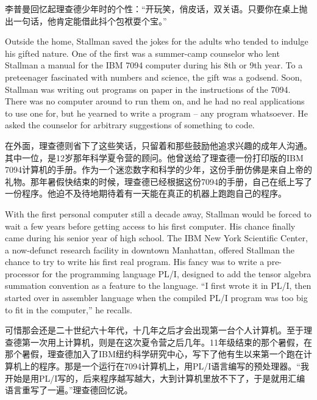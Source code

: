 \ifdefined\chs
李普曼回忆起理查德少年时的个性：“开玩笑，俏皮话，双关语。只要你在桌上抛出一句话，他肯定能借此抖个包袱耍个宝。”
\fi

\ifdefined\eng
Outside the home, Stallman saved the jokes for the adults who tended to indulge his gifted nature. One of the first was a summer-camp counselor who lent Stallman a manual for the IBM 7094 computer during his 8th or 9th year. To a preteenager fascinated with numbers and science, the gift was a godsend. Soon, Stallman was writing out programs on paper in the instructions of the 7094.  There was no computer around to run them on, and he had no real applications to use one for, but he yearned to write a program -- any program whatsoever.  He asked the counselor for arbitrary suggestions of something to code.
\fi

\ifdefined\chs
在外面，理查德则省下了这些笑话，只留着和那些鼓励他追求兴趣的成年人沟通。其中一位，是12岁那年科学夏令营的顾问。他曾送给了理查德一份打印版的IBM 7094计算机的手册。作为一个迷恋数字和科学的少年，这份手册仿佛是来自上帝的礼物。那年暑假快结束的时候，理查德已经根据这份7094的手册，自己在纸上写了一份程序。他迫不及待地期待着有一天能在真正的机器上跑跑自己的程序。
\fi

\ifdefined\eng
With the first personal computer still a decade away, Stallman would be forced to wait a few years before getting access to his first computer. His chance finally came during his senior year of high school.  The IBM New York Scientific Center, a now-defunct research facility in downtown Manhattan, offered Stallman the chance to try to write his first real program.  His fancy was to write a pre-processor for the programming language PL/I, designed to add the tensor algebra summation convention as a feature to the language. ``I first wrote it in PL/I, then started over in assembler language when the compiled PL/I program was too big to fit in the computer,'' he recalls.
\fi

\ifdefined\chs
可惜那会还是二十世纪六十年代，十几年之后才会出现第一台个人计算机。至于理查德第一次用上计算机，则是在这次夏令营之后几年。11年级结束的那个暑假，在那个暑假，理查德加入了IBM纽约科学研究中心，写下了他有生以来第一个跑在计算机上的程序。那是一个运行在7094计算机上，用PL/I语言编写的预处理器。“我开始是用PL/I写的，后来程序越写越大，大到计算机里放不下了，于是就用汇编语言重写了一遍。”理查德回忆说。
\fi

